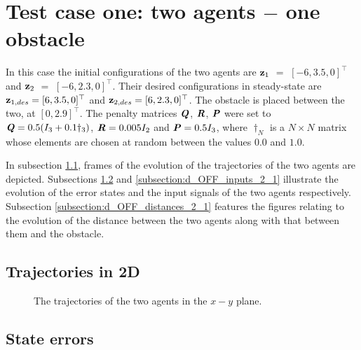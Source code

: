 \section{Test case one: two agents $-$ one obstacle}

In this case the initial configurations of the two agents are
$\bm{\mathbf{z}}_1$ $=$ $[-6, 3.5, 0]^{\top}$ and
$\bm{\mathbf{z}}_2$ $=$ $[-6, 2.3, 0]^{\top}$.
Their desired configurations in steady-state are
$\bm{\mathbf{z}}_{1,des} = [6, 3.5, 0]^{\top}$ and
$\bm{\mathbf{z}}_{2,des} = [6, 2.3, 0]^{\top}$.
The obstacle is placed between the two, at $[0, 2.9]^{\top}$. The penalty
matrices $\bm{\mathit{Q}}$, $\bm{\mathit{R}}$, $\bm{\mathit{P}}$ were set to
$\bm{\mathit{Q}} = 0.5 (I_3 + 0.1 \dagger_3)$, $\bm{\mathit{R}} = 0.005 I_2$ and
$\bm{\mathit{P}} = 0.5 I_3$, where $\dagger_N$ is a $N \times N$ matrix whose
elements are chosen at random between the values $0.0$ and $1.0$.

In subsection \ref{subsection:d_OFF_trajectories_2_1}, frames of the evolution of the
trajectories of the two agents are depicted. Subsections
\ref{subsection:d_OFF_errors_2_1} and \ref{subsection:d_OFF_inputs_2_1} illustrate
the evolution of the error states and the input signals of the two agents
respectively. Subsection \ref{subsection:d_OFF_distances_2_1} features the
figures relating to the evolution of the distance between the two agents
along with that between them and the obstacle.



\subsection{Trajectories in 2D}
\label{subsection:d_OFF_trajectories_2_1}

\begin{figure}[H]
  
  \caption{The trajectories of the two agents in the $x-y$ plane.}
  \label{fig:d_OFF_trajectory_2_1}
\end{figure}


\subsection{State errors}
\label{subsection:d_OFF_errors_2_1}

